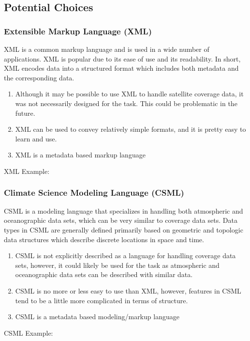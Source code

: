 \documentclass[onecolumn, draftclsnofoot,10pt, compsoc]{IEEEtran}
\begin{document}
\subsection{Potential Choices}

\subsubsection{Extensible Markup Language (XML)}
XML is a common markup language and is used in a wide number of applications. XML is popular due to its ease of use and its readability. In short, XML encodes data into a structured format which includes both metadata and the corresponding data.
\begin{enumerate}
\item Although it may be possible to use XML to handle satellite coverage data, it was not necessarily designed for the task. This could be problematic in the future.
\item XML can be used to convey relatively simple formats, and it is pretty easy to learn and use.
\item XML is a metadata based markup language
\end{enumerate}

XML Example:


\subsubsection{Climate Science Modeling Language (CSML)}
CSML is a modeling language that specializes in handling both atmospheric and oceanographic data sets, which can be very similar to coverage data sets. Data types in CSML are generally defined primarily based on geometric and topologic data structures which describe discrete locations in space and time.
\begin{enumerate}
\item CSML is not explicitly described as a language for handling coverage data sets, however, it could likely be used for the task as atmospheric and oceanographic data sets can be described with similar data.
\item CSML is no more or less easy to use than XML, however, features in CSML tend to be a little more complicated in terms of structure.
\item CSML is a metadata based modeling/markup language
\end{enumerate}

CSML Example:

\end{document}
